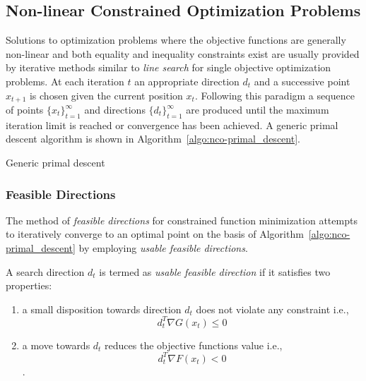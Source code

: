\subsection{Non-linear Constrained Optimization Problems} \label{subsec:theorBack-NCOP}

Solutions to optimization problems where the objective functions are generally non-linear and both equality and inequality constraints exist are usually provided by iterative methods similar to \emph{line search} for single objective optimization problems. At each iteration $t$ an appropriate direction $d_t$ and a successive point $x_{t+1}$ is chosen given the current position $x_t$. Following this paradigm a sequence of points $\{x_t\}_{t=1}^\infty$ and directions $\{d_t\}_{t=1}^\infty$ are produced until the maximum iteration limit is reached or convergence has been achieved. A generic primal descent algorithm is shown in Algorithm~\ref{algo:nco-primal_descent}.

\begin{algorithm}[H]
\caption{Generic primal descent \label{algo:nco-primal_descent}} 
\end{algorithm}

\subsubsection{Feasible Directions} \label{subsubsec:theorBack-feasibleDir}

The method of \emph{feasible directions} for constrained function minimization attempts to iteratively converge to an optimal point on the basis of Algorithm~\ref{algo:nco-primal_descent} by employing \emph{usable feasible directions}.

A search direction $d_t$ is termed as \emph{usable feasible direction} if it satisfies two properties:
\begin{enumerate}
\item a small disposition towards direction $d_t$ does not violate any constraint i.e.,
$$d_t^T \nabla G(x_t)\leq 0$$
\item a move towards $d_t$ reduces the objective functions value i.e.,
$$d_t^T \nabla F(x_t)<0$$.
\end{enumerate}

